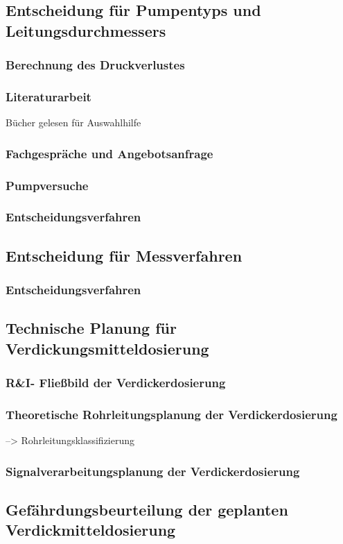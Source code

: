 \subsection{Entscheidung für Pumpentyps und Leitungsdurchmessers}
\subsubsection{Berechnung des Druckverlustes}
\subsubsection{Literaturarbeit}
Bücher gelesen für Auswahlhilfe
\subsubsection{Fachgespräche und Angebotsanfrage}
\subsubsection{Pumpversuche}
\subsubsection{Entscheidungsverfahren}

\subsection{Entscheidung für Messverfahren}
\subsubsection{Entscheidungsverfahren}

\subsection{Technische Planung für Verdickungsmitteldosierung}
\subsubsection{R\&I- Fließbild der Verdickerdosierung}
\subsubsection{Theoretische Rohrleitungsplanung der Verdickerdosierung}
--> Rohrleitungsklassifizierung

\subsubsection{Signalverarbeitungsplanung der Verdickerdosierung}

\subsection{Gefährdungsbeurteilung der geplanten Verdickmitteldosierung}


